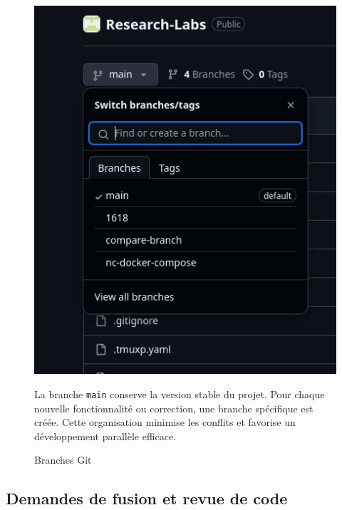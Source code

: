 \documentclass{rapportPfe}
\begin{document}
\begin{figure}[htbp]
    \centering
    \begin{minipage}[t]{0.3\textwidth}
        \vspace{0pt} 
        \includegraphics[width=\textwidth]{diagrams/ss_04.png}
        \caption{Branches Git}
        \label{fig:diagram5}
    \end{minipage}
    \hfill
    \begin{minipage}[t]{0.65\textwidth}
        \vspace{80pt} 
        \noindent La branche \texttt{main} conserve la version stable du projet. Pour chaque nouvelle fonctionnalité ou correction, une branche spécifique est créée. Cette organisation minimise les conflits et favorise un développement parallèle efficace.
    \end{minipage}
\end{figure}



\subsection{Demandes de fusion et revue de code}
\end{document}
